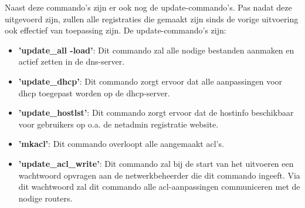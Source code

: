 Naast deze commando's zijn er ook nog de update-commando's. Pas nadat deze uitgevoerd zijn, zullen alle registraties die gemaakt zijn sinds de vorige uitvoering ook effectief van toepassing zijn. De update-commando's zijn:

\begin{itemize}
    \item \textbf{'update\_all -load'}: Dit commando zal alle nodige bestanden aanmaken en actief zetten in de \acrshort{dns}-server.
    \item \textbf{'update\_dhcp'}: Dit commando zorgt ervoor dat alle aanpassingen voor \acrshort{dhcp} toegepast worden op de \acrshort{dhcp}-server.
    \item \textbf{'update\_hostlst'}: Dit commando zorgt ervoor dat de hostinfo beschikbaar voor gebruikers op o.a. de netadmin registratie website.
    \item \textbf{'mkacl'}: Dit commando overloopt alle aangemaakt \acrshort{acl}'s.
    \item \textbf{'update\_acl\_write'}: Dit commando zal bij de start van het uitvoeren een wachtwoord opvragen aan de netwerkbeheerder die dit commando ingeeft. Via dit wachtwoord zal dit commando alle \acrshort{acl}-aanpassingen communiceren met de nodige routers.
\end{itemize}


